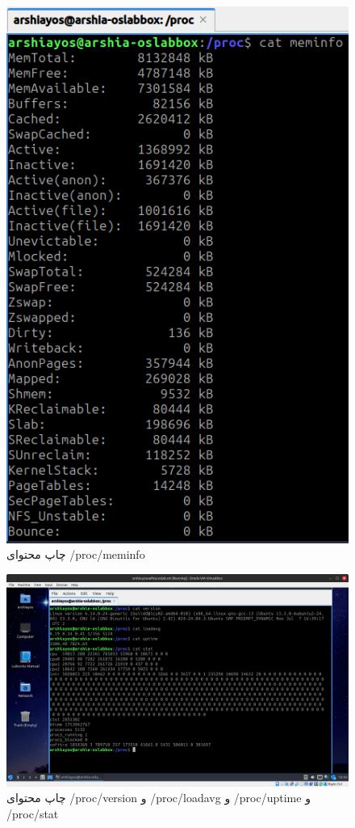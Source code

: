 \documentclass[12pt]{article}
\begin{document}
	\begin{figure}[H]
		\centering
		\includegraphics[width=\textwidth]{report3-resources/21.png}
		\caption{چاپ محتوای /proc/meminfo}
		\label{fig:20}
	\end{figure}
	\begin{figure}[H]
		\centering
		\includegraphics[width=\textwidth]{report3-resources/211.png}
		\caption{چاپ محتوای /proc/version و /proc/loadavg و /proc/uptime و /proc/stat}
		\label{fig:21}
	\end{figure}
\end{document}
